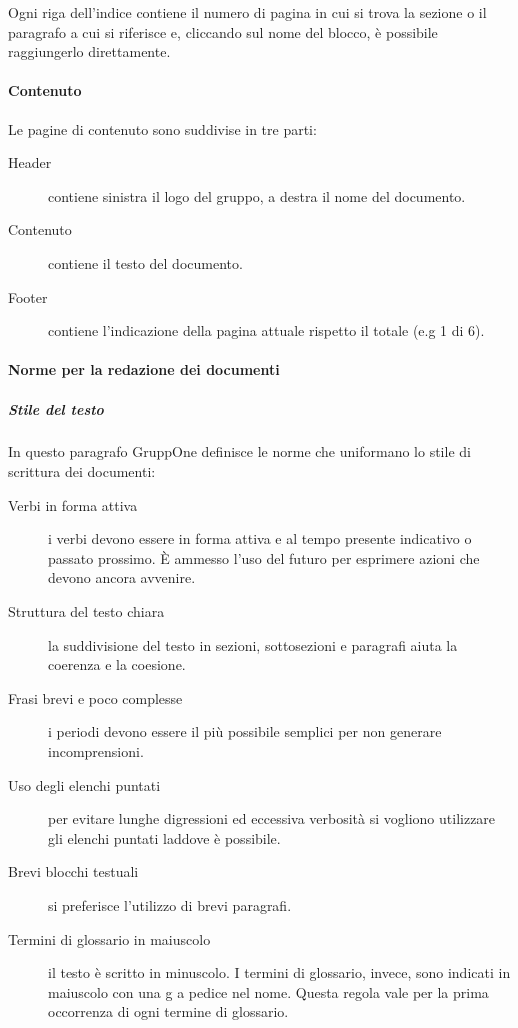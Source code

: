 \documentclass[../norme-di-progetto.tex]{subfiles}
\begin{document}
Ogni riga dell'indice contiene il numero di pagina in cui si trova la sezione o il paragrafo a cui si riferisce e, cliccando sul nome del blocco, è possibile raggiungerlo direttamente.

\paragraph{Contenuto}%
\label{par:contenuto}
Le pagine di contenuto sono suddivise in tre parti:
\begin{description}
  \item [Header] contiene sinistra il logo del gruppo, a destra il nome del documento.
  \item [Contenuto] contiene il testo del documento.
  \item [Footer] contiene l'indicazione della pagina attuale rispetto il totale (e.g 1 di 6).
\end{description}

\paragraph{Norme per la redazione dei documenti}%
\label{par:norme_per_la_redazione_dei_documenti}

\subparagraph{Stile del testo}%
\label{subp:stile_del_testo}
In questo paragrafo GruppOne definisce le norme che uniformano lo stile di scrittura dei documenti:
\begin{description}
  \item [Verbi in forma attiva] i verbi devono essere in forma attiva e al tempo presente indicativo o passato prossimo. È ammesso l'uso del futuro per esprimere azioni che devono ancora avvenire.
  \item [Struttura del testo chiara] la suddivisione del testo in sezioni, sottosezioni e paragrafi aiuta la coerenza e la coesione.
  \item [Frasi brevi e poco complesse] i periodi devono essere il più possibile semplici per non generare incomprensioni.
  \item [Uso degli elenchi puntati] per evitare lunghe digressioni ed eccessiva verbosità si vogliono utilizzare gli elenchi puntati laddove è possibile.
  \item [Brevi blocchi testuali] si preferisce l'utilizzo di brevi paragrafi.
  \item [Termini di glossario in maiuscolo] il testo è scritto in minuscolo. I termini di glossario, invece, sono indicati in maiuscolo con una g a pedice nel nome. Questa regola vale per la prima occorrenza di ogni termine di glossario.
\end{description}
\end{document}
